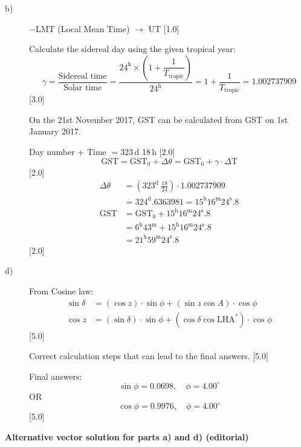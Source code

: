 \begin{description}
\item[b)] $-$LMT (Local Mean Time) $\rightarrow$ UT \hfill[1.0]

  Calculate the sidereal day using the given tropical year:
  \[ \gamma = \frac{\text{Sidereal time}}{\text{Solar time}}
     = \frac{24^{\mathrm{h}}\times\left(1
       + \dfrac{1}{T_{\mathrm{tropic}}}\right)}{24^{\mathrm{h}}}
     = 1 + \frac{1}{T_{\mathrm{tropic}}} = 1.002737909 \]
  \hfill[3.0]

  On the 21st November 2017, GST can be calculated from GST on 1st January
  2017.

  Day number $+$ Time $= 323$\,d 18\,h \hfill[2.0]
  \[ \mathrm{GST} = \mathrm{GST}_0 + \Delta\theta
     = \mathrm{GST}_0 + \gamma\cdot\Delta\mathrm{T} \]
  \hfill[2.0]
  \begin{align*}
  \Delta\theta &= \left(323^{\mathrm{d}}\ \tfrac{18}{24}\right)
    \cdot 1.002737909\\
  &= 324^{\mathrm{d}}.6363981
   = 15^{\mathrm{h}}16^{\mathrm{m}}24^{\mathrm{s}}.8\\
  \mathrm{GST} &= \mathrm{GST}_0
    + 15^{\mathrm{h}}16^{\mathrm{m}}24^{\mathrm{s}}.8\\
  &= 6^{\mathrm{h}}43^{\mathrm{m}}
   + 15^{\mathrm{h}}16^{\mathrm{m}}24^{\mathrm{s}}.8\\
  &= 21^{\mathrm{h}}59^{\mathrm{m}}24^{\mathrm{s}}.8
  \end{align*}
  \hfill[2.0]

\item[d)] From Cosine law:
  \begin{align*}
  \sin\delta &= (\cos z)\cdot\sin\phi + (\sin z\cos A)\cdot\cos\phi\\
  \cos z &= (\sin\delta)\cdot\sin\phi
    + (\cos\delta\cos\mathrm{LHA}^{*})\cdot\cos\phi
  \end{align*}
  \hfill[5.0]

  Correct calculation steps that can lead to the final answers. \hfill[5.0]

  Final answers:
  \[ \sin\phi = 0.0698,\quad \phi = 4.00^\circ \]
  OR
  \[ \cos\phi = 0.9976,\quad \phi = 4.00^\circ \]
  \hfill[5.0]
\end{description}

\textbf{Alternative vector solution for parts a) and d) (editorial)}

